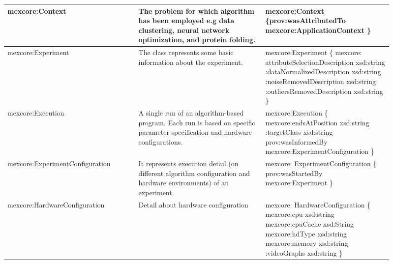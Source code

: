 \documentclass[preprint,12pt]{elsarticle}
\begin{document}
{\begin{longtable}[!h]{ | p{0.31\linewidth} | p{0.3\linewidth}| p{0.3\linewidth} |}
mexcore:Context & The problem for which algorithm has been employed e.g data clustering, neural network optimization, and protein folding. &{\scriptsize mexcore:Context \{\newline prov:wasAttributedTo mexcore:ApplicationContext \newline \} }\\
\hline

mexcore:Experiment & The class represents some basic information about the experiment. & {\scriptsize mexcore:Experiment \{ \newline mexcore: attributeSelectionDescription xsd:string \newline :dataNormalizedDescription xsd:string \newline :noiseRemovedDescription xsd:string \newline :outliersRemovedDescription xsd:string \newline  \} }\\
\hline

mexcore:Execution & A single run of an algorithm-based program. Each run is based on specific parameter specification and hardware configurations. & {\scriptsize mexcore:Execution \{ \newline mexcore:endsAtPosition xsd:string \newline :targetClass xsd:string \newline prov:wasInformedBy mexcore:ExperimentConfiguration \newline \}    }\\
\hline

mexcore:ExperimentConfiguration & It represents execution detail (on different algorithm configuration and hardware environments) of an experiment. & {\scriptsize mexcore: ExperimentConfiguration \{ \newline prov:wasStartedBy mexcore:Experiment \newline \}   }\\
\hline

mexcore:HardwareConfiguration & Detail about hardware configuration & {\scriptsize mexcore: HardwareConfiguration \{ \newline mexcore:cpu xsd:string \newline mexcore:cpuCache xsd:String \newline mexcore:hdType xsd:string \newline mexcore:memory xsd:string \newline :videoGraphs xsd:string \newline \} }\\
\hline


\end{longtable}}
\end{document}
